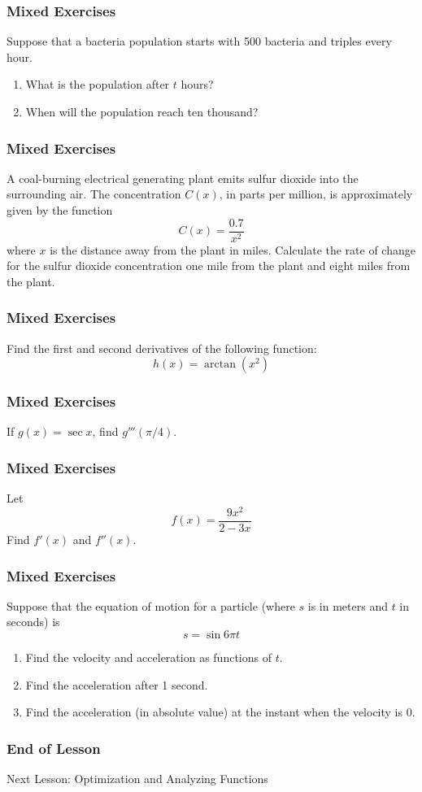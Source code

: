 \documentclass[xcolor=dvipsnames]{beamer}
\begin{document}
\begin{frame}
  \frametitle{Mixed Exercises}
  Suppose that a bacteria population starts with 500 bacteria and
  triples every hour.
  \begin{enumerate}
  \item What is the population after $t$ hours?
  \item When will the population reach ten thousand?
  \end{enumerate}
\end{frame}

\begin{frame}
  \frametitle{Mixed Exercises}
  A coal-burning electrical generating plant emits sulfur dioxide into
  the surrounding air. The concentration $C(x)$, in parts per million,
  is approximately given by the function
  \begin{equation}
    \label{eq:sahtuodo}
    C(x)=\frac{0.7}{x^{2}}
  \end{equation}
  where $x$ is the distance away from the plant in miles. Calculate
  the rate of change for the sulfur dioxide concentration one mile
  from the plant and eight miles from the plant.
\end{frame}

\begin{frame}
  \frametitle{Mixed Exercises}
  Find the first and second derivatives of the following function:
  \begin{equation}
    \label{eq:oophacuz}
    h(x)=\arctan(x^{2})
  \end{equation}
\end{frame}

\begin{frame}
  \frametitle{Mixed Exercises}
  If $g(x)=\sec{}x$, find $g'''(\pi/4)$.
\end{frame}

\begin{frame}
  \frametitle{Mixed Exercises}
  Let
  \begin{equation}
    \label{eq:roohahou}
    f(x)=\frac{9x^{2}}{2-3x}
  \end{equation}
Find $f'(x)$ and $f''(x)$.
\end{frame}

\begin{frame}
  \frametitle{Mixed Exercises}
  Suppose that the equation of motion for a particle (where $s$ is in
  meters and $t$ in seconds) is
  \begin{equation}
    \label{eq:eelajaim}
    s=\sin{}6\pi{}t
  \end{equation}
  \begin{enumerate}
  \item Find the velocity and acceleration as functions of $t$. 
  \item Find the acceleration after 1 second.
  \item Find the acceleration (in absolute value) at the instant when the velocity is 0.
  \end{enumerate}
\end{frame}

\begin{frame}
  \frametitle{End of Lesson}
Next Lesson: Optimization and Analyzing Functions
\end{frame}
\end{document}
